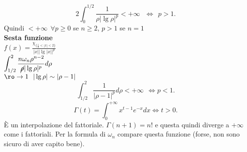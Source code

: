 \documentclass[12px]{article}
\begin{document}
 \[
	 2\int^{1/2}_0\frac{1}{\rho|\lg\rho|^p} < +\infty \  \ \ \Leftrightarrow \ \ p >1
.\] 
Quindi $< +\infty \ \ \forall p \geq 0 $ se  $n\geq 2$, $p > 1$ se  $n=1$\\
 \textbf{Sesta funzione}\\
$\displaystyle f(x) =  \frac{\chi_{\{\frac 12 < |x|< 2\}}}{|x||\lg|x||^p}$\\
$\displaystyle\int_{1/2}^2\frac{n\omega_n\rho^{n-2}}{\cancel \rho |\lg\rho|^p}d\rho$\\
$\ro \rightarrow 1 \ \ |\lg\rho|\sim|\rho -1|$\\
\[
	\int_{1/2}^2\frac{1}{|\rho-1|^p}d\rho < +\infty\ \ \Leftrightarrow p < 1
.\] 
\[
	\Gamma (t) = \int^{+\infty}_0x^{t-1}e^{-x}dx \Leftrightarrow t > 0
.\] 
È un interpolazione del fattoriale. $\Gamma(n+1) = n!$ e questa quindi diverge a $ + \infty$ come i fattoriali. Per la formula di  $\omega_n$ compare questa funzione (forse, non sono sicuro di aver capito bene).
\end{document}
